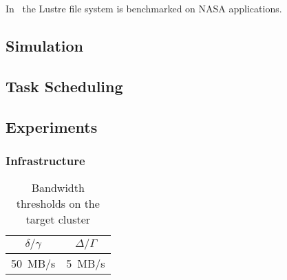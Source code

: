 \documentclass{IEEEtran}
\begin{document}



In~\cite{saini2012performance} the Lustre file system is benchmarked on NASA applications. 

\subsection{Simulation} %




\subsection{Task Scheduling}


\subsection{Experiments} %

\subsubsection{Infrastructure} %


\begin{table}
\centering
\begin{tabular}{c|c}
$\delta/\gamma$ & $\Delta/\Gamma$\\
\hline
50~MB/s         & 5~MB/s
\end{tabular}
\label{table:infrastructure}
\caption{Bandwidth thresholds on the target cluster}
\end{table}
\end{document}
